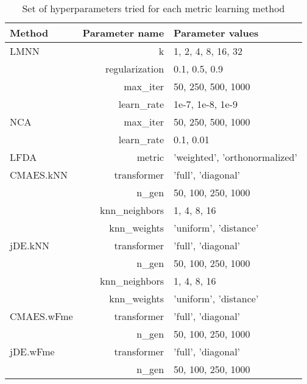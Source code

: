 \begin{table}[ht] \centering
\begin{tabular}{lrl}
\hline
Method & Parameter name & Parameter values \\
\hline

LMNN
    & k & 1, 2, 4, 8, 16, 32  \\
    & regularization & 0.1, 0.5, 0.9  \\
    & max\_iter & 50, 250, 500, 1000  \\
    & learn\_rate & 1e-7, 1e-8, 1e-9  \\
NCA
    & max\_iter & 50, 250, 500, 1000  \\
    & learn\_rate & 0.1, 0.01  \\

LFDA
    & metric & 'weighted', 'orthonormalized'  \\

CMAES.kNN
    & transformer & 'full', 'diagonal'  \\
    & n\_gen & 50, 100, 250, 1000  \\
    & knn\_neighbors & 1, 4, 8, 16  \\
    & knn\_weights & 'uniform', 'distance'  \\

jDE.kNN
    & transformer & 'full', 'diagonal'  \\
    & n\_gen & 50, 100, 250, 1000  \\
    & knn\_neighbors & 1, 4, 8, 16  \\
    & knn\_weights & 'uniform', 'distance'  \\

CMAES.wFme
    & transformer & 'full', 'diagonal'  \\
    & n\_gen & 50, 100, 250, 1000  \\

jDE.wFme
    & transformer & 'full', 'diagonal'  \\
    & n\_gen & 50, 100, 250, 1000  \\


\hline
\end{tabular}
\caption{Set of hyperparameters tried for each metric learning method} \label{tab:hyperparams}
\end{table}
